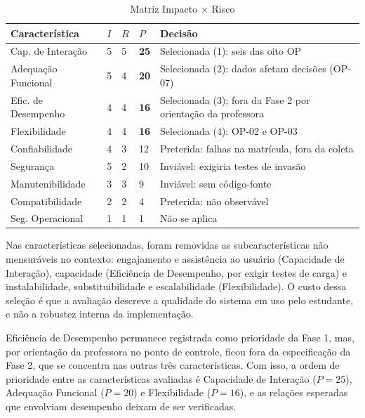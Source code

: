 \begin{table}[!t]
	\caption{Matriz Impacto $\times$ Risco}
	\label{tab:matriz}
	\centering
	\footnotesize
	\begin{tabularx}{\columnwidth}{L{2.25cm} C{0.2cm} C{0.2cm} C{0.35cm} Y}
		\toprule
		\textbf{Característica} & $I$ & $R$ & $P$ & \textbf{Decisão} \\
		\midrule
		Cap. de Interação & 5 & 5 & \textbf{25} & Selecionada (1): seis das oito OP \\
		Adequação Funcional & 5 & 4 & \textbf{20} & Selecionada (2): dados afetam decisões (OP-07) \\
		Efic. de Desempenho & 4 & 4 & \textbf{16} & Selecionada (3); fora da Fase 2 por orientação da professora \\
		Flexibilidade & 4 & 4 & \textbf{16} & Selecionada (4): OP-02 e OP-03 \\
		Confiabilidade & 4 & 3 & 12 & Preterida: falhas na matrícula, fora da coleta \\
		Segurança & 5 & 2 & 10 & Inviável: exigiria testes de invasão \\
		Manutenibilidade & 3 & 3 & 9 & Inviável: sem código-fonte \\
		Compatibilidade & 2 & 2 & 4 & Preterida: não observável \\
		Seg. Operacional & 1 & 1 & 1 & Não se aplica \\
		\bottomrule
	\end{tabularx}
\end{table}

Nas características selecionadas, foram removidas as subcaracterísticas não mensuráveis no contexto: engajamento e assistência ao usuário (Capacidade de Interação), capacidade (Eficiência de Desempenho, por exigir testes de carga) e instalabilidade, substituibilidade e escalabilidade (Flexibilidade). O custo dessa seleção é que a avaliação descreve a qualidade do sistema em uso pelo estudante, e não a robustez interna da implementação.

Eficiência de Desempenho permanece registrada como prioridade da Fase 1, mas, por orientação da professora no ponto de controle, ficou fora da especificação da Fase 2, que se concentra nas outras três características. Com isso, a ordem de prioridade entre as características avaliadas é Capacidade de Interação ($P = 25$), Adequação Funcional ($P = 20$) e Flexibilidade ($P = 16$), e as relações esperadas que envolviam desempenho deixam de ser verificadas.

